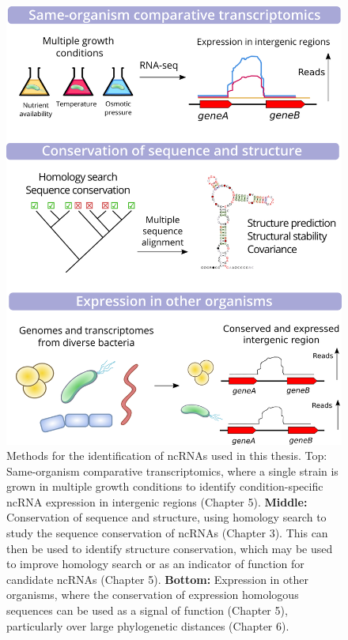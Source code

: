 \newpage
\begin{figure}[H]
    \centering
    \includegraphics[scale=0.9]{other/ways_to_find_ncRNAs.png}
    \caption[Methods for the identification of ncRNAs used in this thesis]{Methods for the identification of ncRNAs used in this thesis. Top: Same-organism comparative transcriptomics, where a single strain is grown in multiple growth conditions to identify condition-specific ncRNA expression in intergenic regions (Chapter 5). \textbf{Middle:} Conservation of sequence and structure, using homology search to study the sequence conservation of ncRNAs (Chapter 3). This can then be used to identify structure conservation, which may be used to improve homology search or as an indicator of function for candidate ncRNAs (Chapter 5). \textbf{Bottom:} Expression in other organisms, where the conservation of expression homologous sequences can be used as a signal of function (Chapter 5), particularly over large phylogenetic distances (Chapter 6). }
    \label{fig:conclusion_methods}
\end{figure}


